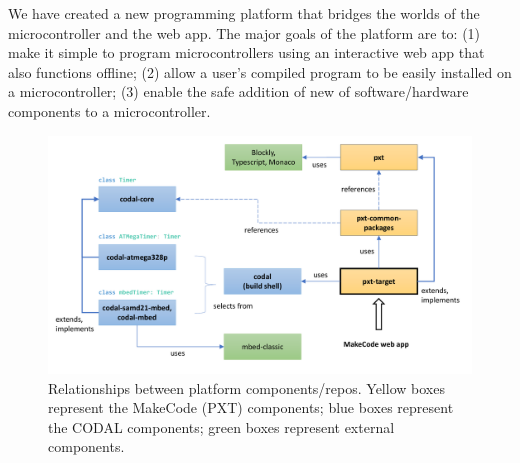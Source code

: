 We have created a new programming platform that bridges the worlds of the microcontroller
and the web app. The major goals of the platform are to: (1)
make it simple to program microcontrollers using an interactive web app that also functions offline;
(2) allow a user's compiled program to be easily installed on a microcontroller;
(3) enable the safe addition of new of software/hardware components to a microcontroller.

\begin{figure}[t]
  \includegraphics[width=5.5in]{reposFig.pdf}
  \caption{\label{fig:repos}Relationships between platform components/repos. Yellow boxes represent the MakeCode (PXT) components; blue
  boxes represent the CODAL components; green boxes represent external components.}
\end{figure}

